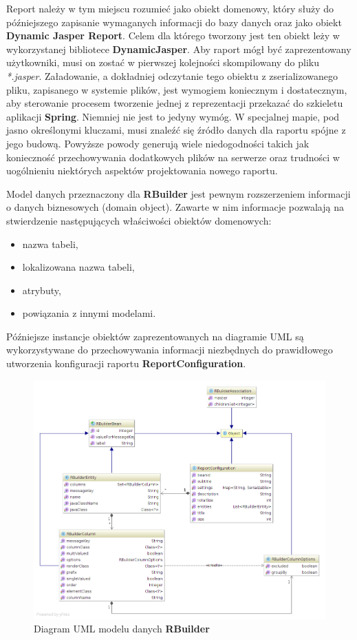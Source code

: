 	Report należy w tym miejscu rozumieć jako obiekt domenowy, który służy do późniejszego zapisanie
	wymaganych informacji do bazy danych oraz jako obiekt \textbf{Dynamic Jasper Report}. Celem dla którego
	tworzony jest ten obiekt leży w wykorzystanej bibliotece \textbf{DynamicJasper}. 
	Aby raport mógł być zaprezentowany użytkowniki, musi on zostać w pierwszej kolejności
	skompilowany do pliku \textit{*.jasper}. Załadowanie, a dokładniej odczytanie tego obiektu z zserializowanego
	pliku, zapisanego w systemie plików, jest wymogiem koniecznym i dostatecznym, aby sterowanie procesem
	tworzenie jednej z reprezentacji przekazać do szkieletu aplikacji \textbf{Spring}. Niemniej nie jest to jedyny
	wymóg. W specjalnej mapie, pod jasno określonymi kluczami, musi znaleźć się źródło danych dla raportu spójne z jego budową.
	Powyższe powody generują wiele niedogodności takich jak konieczność przechowywania dodatkowych plików na serwerze oraz
	trudności w uogólnieniu niektórych aspektów projektowania nowego raportu.
	
	Model danych przeznaczony dla \textbf{RBuilder} jest pewnym rozszerzeniem informacji o 
	danych biznesowych (domain object). Zawarte w nim informacje pozwalają na stwierdzenie następujących
	właściwości obiektów domenowych:
	\begin{itemize}
		\item nazwa tabeli,
		\item lokalizowana nazwa tabeli,
		\item atrybuty,
		\item powiązania z innymi modelami.
	\end{itemize}
	
	Późniejsze instancje obiektów zaprezentowanych na diagramie UML są wykorzystywane do przechowywania
	informacji niezbędnych do prawidłowego utworzenia konfiguracji raportu \textbf{ReportConfiguration}.
	
	\begin{figure}[H]
		\centering
		\includegraphics[width=1.0\textwidth]{images/rbuilder_dataModel}
		\caption[Diagram UML modelu danych \textbf{RBuilder}]{
			Diagram UML modelu danych \textbf{RBuilder}
		}
		\label{app:rbuilder_data_Model}
	\end{figure}	
	
